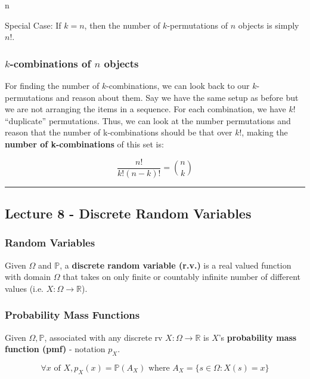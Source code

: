 n\documentclass{article}
\begin{document}
Special Case: If $k = n$, then the number of $k$-permutations of $n$
objects is simply $n!$.

\bigskip
\subsubsection{$k$-combinations of $n$ objects}

For finding the number of $k$-combinations, we can look back to our
$k$-permutations and reason about them. Say we have the same setup as
before but we are not arranging the items in a sequence. For each
combination, we have $k!$ ``duplicate'' permutations. Thus, we can
look at the number permutations and reason that the number of
k-combinations should be that over $k!$, making the \textbf{number of
  k-combinations} of this set is:

\begin{equation}
  \tag{K-combinations}
  \boxed{
    \frac{n!}{k!(n-k)!} = \binom{n}{k}
  }
\end{equation}


\medskip\hrule
\subsection{Lecture 8 - Discrete Random Variables}

\subsubsection{Random Variables}

Given $\Omega$ and $\mathbb{P}$, a \textbf{discrete random variable
  (r.v.)} is a real valued function with domain $\Omega$ that takes on
only finite or countably infinite number of different values (i.e. $X
: \Omega \rightarrow \mathbb{R}$).

\subsubsection{Probability Mass Functions}

Given $\Omega, \mathbb{P}$, associated with any discrete rv $X :
\Omega \rightarrow \mathbb{R}$ is $X$'s \textbf{probability mass
  function (pmf)} - notation $p_X$.

\begin{equation}
  \tag{pmf Def}
  \boxed{
    \forall x \text{ of } X, p_X(x) = \mathbb{P}(A_X)
    \text{ where } A_X = \{s \in \Omega : X(s) = x\}
  }
\end{equation}
\end{document}
